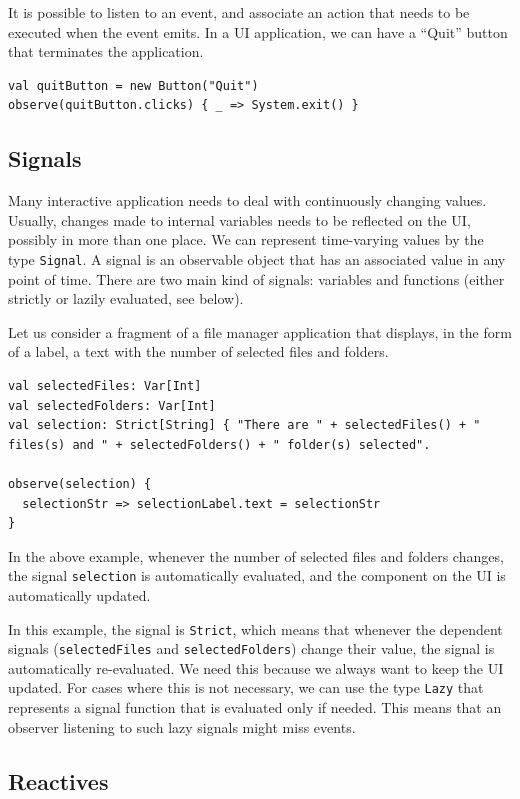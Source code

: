 It is possible to listen to an event, and associate an action that needs to be executed when the event emits. In a UI application, we can have a ``Quit'' button that terminates the application.
\begin{lstlisting}
val quitButton = new Button("Quit")
observe(quitButton.clicks) { _ => System.exit() }
\end{lstlisting}

\subsection{Signals}

Many interactive application needs to deal with continuously changing values. Usually, changes made to internal variables needs to be reflected on the UI, possibly in more than one place. We can represent time-varying values by the type \texttt{Signal}. A signal is an observable object that has an associated value in any point of time. There are two main kind of signals: variables and functions (either strictly or lazily evaluated, see below).

Let us consider a fragment of a file manager application that displays, in the form of a label, a text with the number of selected files and folders.

\begin{lstlisting}
val selectedFiles: Var[Int]
val selectedFolders: Var[Int]
val selection: Strict[String] { "There are " + selectedFiles() + " files(s) and " + selectedFolders() + " folder(s) selected".

observe(selection) {
  selectionStr => selectionLabel.text = selectionStr
}
\end{lstlisting}

In the above example, whenever the number of selected files and folders changes, the signal \texttt{selection} is automatically evaluated, and the component on the UI is automatically updated. 

In this example, the signal is \texttt{Strict}, which means that whenever the dependent signals (\texttt{selectedFiles} and \texttt{selectedFolders}) change their value, the signal is automatically re-evaluated. We need this because we always want to keep the UI updated. For cases where this is not necessary, we can use the type \texttt{Lazy} that represents a signal function that is evaluated only if needed. This means that an observer listening to such lazy signals might miss events.

\subsection{Reactives}


